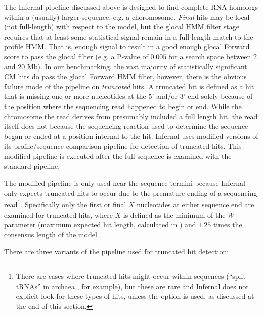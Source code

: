 The Infernal pipeline discussed above is designed to find complete RNA
homologs within a (usually) larger sequence, e.g. a choromosome.
\emph{Final} hits may be local (not full-length) with respect to the
model, but the glocal HMM filter stage requires that at least some
statistical signal remain in a full length match to the profile
HMM. That is, enough signal to result in a good enough glocal Forward
score to pass the glocal filter (e.g. a P-value of $0.005$ for a
search space between 2 and 20 Mb). In our benchmarking, the vast
majority of statistically significant CM hits do pass the glocal
Forward HMM filter, however, there is the obvious failure mode of the
pipeline on \emph{truncated} hits. A truncated hit is defined as a hit
that is missing one or more nucleotides at the 5' and/or 3' end solely
because of the position where the sequencing read happened to begin or
end. While the chromosome the read derives from presumably included a
full length hit, the read itself does not because the sequencing
reaction used to determine the sequence began or ended at a position
internal to the hit. Infernal uses modified versions of its
profile/sequence comparison pipeline for detection of truncated hits.
This modified pipeline is executed after the full sequence is examined
with the standard pipeline.

The modified pipeline is only used near the sequence termini because
Infernal only expects truncated hits to occur due to the premature
ending of a sequencing read\footnote{There are cases where truncated
hits might occur within sequences (``split tRNAs'' in archaea
\citep{Randau05}, for example), but these are rare and Infernal does
not explicit look for these types of hits, unless the
 option is used, as discussed at the end of this
section.}. Specifically only the first or final $X$ nucleotides at
either sequence end are examined for truncated hits, where $X$ is
defined as the minimum of the $W$ parameter (maximum expected hit
length, calculated in ) and $1.25$ times the consensus
length of the model.

There are three variants of the pipeline used for truncated hit
detection:

